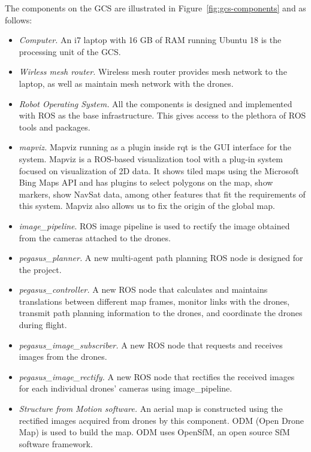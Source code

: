 The components on the GCS are illustrated in Figure~\ref{fig:gcs-components} and as follows:
\begin{itemize}
	\item \textit{Computer.} An i7 laptop with 16 GB of RAM running Ubuntu 18 is the processing unit of the GCS.
	\item \textit{Wirless mesh router.}  Wireless mesh router provides mesh network to the laptop, as well as maintain mesh network with the drones.
	\item \textit{Robot Operating System.} All the components is designed and implemented with ROS as the base infrastructure. This gives access to the plethora of ROS tools and packages.
	\item \textit{mapviz.} Mapviz running as a plugin inside rqt is the GUI interface for the system. Mapviz is a ROS-based visualization tool with a plug-in system focused on visualization of 2D data. It shows tiled maps using the Microsoft Bing Maps API and has plugins to select polygons on the map, show markers, show NavSat data, among other features that fit the requirements of this system. Mapviz also allows us to fix the origin of the global map.
	\item \textit{image\_pipeline}. ROS image pipeline is used to rectify the image obtained from the cameras attached to the drones.
	\item \textit{pegasus\_planner.} A new multi-agent path planning ROS node is designed for the project.
	\item \textit{pegasus\_controller.} A new ROS node that calculates and maintains translations between different map frames, monitor links with the drones, transmit path planning information to the drones, and coordinate the drones during flight.
	\item \textit{pegasus\_image\_subscriber.} A new ROS node that requests and receives images from the drones.
	\item \textit{pegasus\_image\_rectify.} A new ROS node that rectifies the received images for each individual drones' cameras using image\_pipeline.  
	\item \textit{Structure from Motion software.} An aerial map is constructed using the rectified images acquired from drones by this component. ODM (Open Drone Map) is used to build the map. ODM uses OpenSfM, an open source SfM software framework.
\end{itemize}

